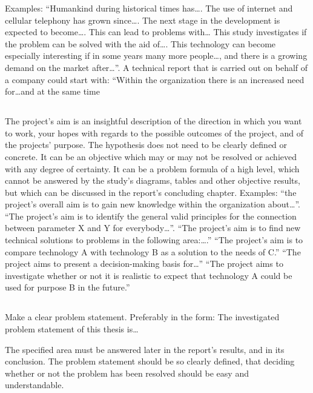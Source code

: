Examples: ``Humankind during historical times has\dots. The use of internet and
cellular telephony has grown since\dots. The next stage in the development is
expected to become\dots. This can lead to problems with… This study investigates if
the problem can be solved with the aid of\dots. This technology can become
especially interesting if in some years many more people\dots, and there is a
growing demand on the market after\dots''.
A technical report that is carried out on behalf of a company could start with:
“Within the organization there is an increased need for\dots and at the same time

\subsection{}\label{subsec:aim}
\noindent
The project's aim is an insightful description of the direction in which you
want to work, your hopes with regards to the possible outcomes of the project,
and of the projects' purpose. The hypothesis does not need to be clearly defined
or concrete. It can be an objective which may or may not be resolved or achieved
with any degree of certainty. It can be a problem formula of a high level, which
cannot be answered by the study's diagrams, tables and other objective results,
but which can be discussed in the report's concluding chapter. Examples: ``the
project's overall aim is to gain new knowledge within the organization
about\dots''.
``The project's aim is to identify the general valid principles for the
connection between parameter X and Y for everybody\dots''. ``The project's aim is to
find new technical solutions to problems in the following area:\dots.'' ``The
project's aim is to compare technology A with technology B as a solution to the
needs of C.'' ``The project aims to present a decision-making basis for\dots''
``The project aims to investigate whether or not it is realistic to expect that
technology A could be used for purpose B in the future.''

\subsection{}\label{subsec:problem}
Make a clear problem statement. Preferably in the form: The investigated problem
statement of this thesis is\dots 

The specified area must be answered later in the report's results, and in its
conclusion. The problem statement should be so clearly defined, that deciding
whether or not the problem has been resolved should be easy and understandable.


